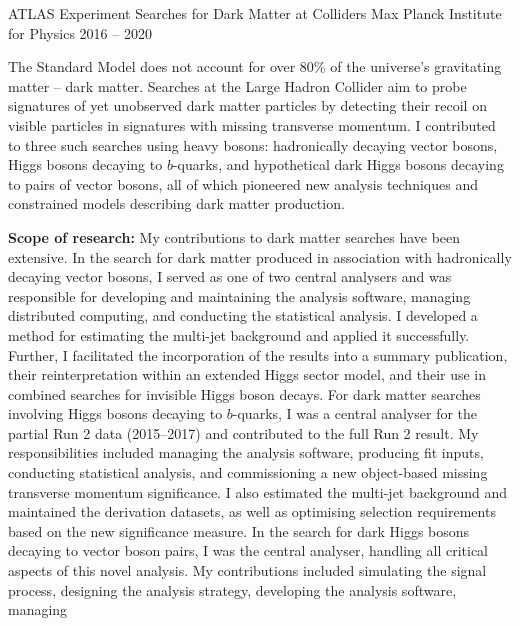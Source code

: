 \begin{cventries}
  \cventry
    {ATLAS Experiment} %
    {Searches for Dark Matter at Colliders} %
    {Max Planck Institute for Physics} %
    {2016 -- 2020} %
    {
      \begin{cvitems} %
        \item {The Standard Model does not account for over 80\% of the universe’s gravitating matter – dark matter. Searches at the Large Hadron Collider aim to probe signatures of yet unobserved dark matter particles by detecting their recoil on visible particles in signatures with missing transverse momentum. I contributed to three such searches using heavy bosons: hadronically decaying vector bosons, Higgs bosons decaying to \(b\)-quarks, and hypothetical dark Higgs bosons decaying to pairs of vector bosons, all of which pioneered new analysis techniques and constrained models describing dark matter production.}
        \item \textbf{Scope of research:} My contributions to dark matter searches have been extensive. In the search
        for dark matter produced in association with hadronically decaying vector bosons, I served as
        one of two central analysers and was responsible for developing and maintaining the analysis
        software, managing distributed computing, and conducting the statistical analysis. I developed
        a method for estimating the multi-jet background and applied it successfully. Further, I
        facilitated the incorporation of the results into a summary publication, their reinterpretation
        within an extended Higgs sector model, and their use in combined searches for invisible Higgs
        boson decays. For dark matter searches involving Higgs bosons decaying to \(b\)-quarks, I was a
        central analyser for the partial Run 2 data (2015--2017) and contributed to the full Run 2 result.
        My responsibilities included managing the analysis software, producing fit inputs, conducting
        statistical analysis, and commissioning a new object-based missing transverse momentum
        significance. I also estimated the multi-jet background and maintained the derivation datasets,
        as well as optimising selection requirements based on the new significance measure. In the
        search for dark Higgs bosons decaying to vector boson pairs, I was the central analyser,
        handling all critical aspects of this novel analysis. My contributions included simulating the
        signal process, designing the analysis strategy, developing the analysis software, managing

\end{cvitems}}
\end{cventries}

